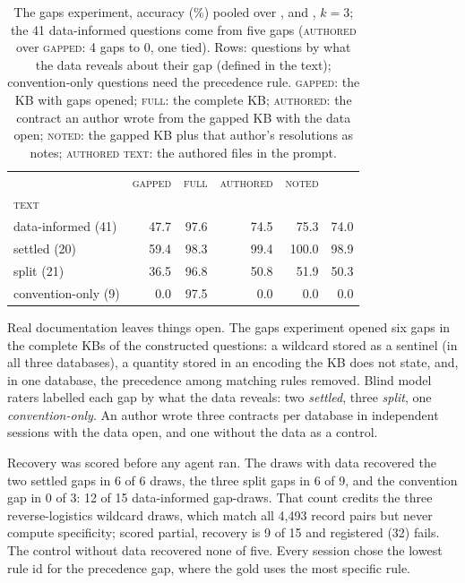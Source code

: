 \begin{table}[t]
\centering
\footnotesize
\setlength{\tabcolsep}{2pt}
\begin{tabular}{@{}lrrrrr@{}}
\toprule
& \textsc{gapped} & \textsc{full} & \textsc{authored} & \textsc{noted} & \shortstack{\textsc{authored}\\\textsc{text}} \\
\midrule
data-informed (41) & 47.7 & 97.6 & 74.5 & 75.3 & 74.0 \\
\quad settled (20) & 59.4 & 98.3 & 99.4 & 100.0 & 98.9 \\
\quad split (21) & 36.5 & 96.8 & 50.8 & 51.9 & 50.3 \\
convention-only (9) & 0.0 & 97.5 & 0.0 & 0.0 & 0.0 \\
\bottomrule
\end{tabular}
\caption{The gaps experiment, accuracy (\%) pooled over \mLuna{},
\mQwen{} and \mSol{}, $k{=}3$; the 41 data-informed questions come from
five gaps (\textsc{authored} over \textsc{gapped}: 4 gaps to 0, one tied). Rows: questions by what the data reveals
about their gap (defined in the text); convention-only questions need the
precedence rule. \textsc{gapped}: the KB with gaps opened;
\textsc{full}: the complete KB; \textsc{authored}: the contract an author
wrote from the gapped KB with the data open; \textsc{noted}: the gapped
KB plus that author's resolutions as notes; \textsc{authored text}: the authored files in the prompt.}
\label{tab:gaps}
\end{table}

Real documentation leaves things open. The gaps experiment opened six gaps
in the complete KBs of the constructed questions: a wildcard stored as a
sentinel (in all three databases), a quantity stored in an encoding the KB
does not state, and, in one database, the precedence among matching rules
removed. Blind model raters labelled each gap by what the data reveals:
two \emph{settled}, three \emph{split}, one \emph{convention-only}. An
author wrote three contracts per database in independent sessions with the
data open, and one without the data as a control.

Recovery was scored before any agent ran. The draws with data recovered
the two settled gaps in 6 of 6 draws, the three split gaps in 6 of 9, and
the convention gap in 0 of 3: 12 of 15 data-informed gap-draws. That
count credits the three reverse-logistics wildcard draws, which match all
4{,}493 record pairs but never compute specificity; scored partial,
recovery is 9 of 15 and registered (32) fails. The control without data
recovered none of five. Every session chose the lowest rule id for the
precedence gap, where the gold uses the most specific rule.


